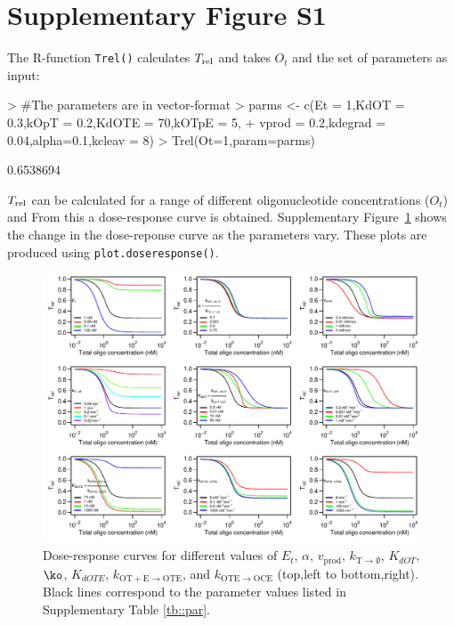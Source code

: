 \documentclass[a4paper,11pt]{article}
\newcommand{\kt}{k_{\mathrm{OT+E \to OTE}}}
\newcommand{\kE}{k_{\mathrm{OTE \to OCE}}}
\newcommand{\vp}{v_{\mathrm{prod}}}
\newcommand{\vd}{k_{\mathrm{T \to \emptyset}}}
\newcommand{\Trel}{T_{\rm{rel}}}
\begin{document}
\section{Supplementary Figure S1}
The R-function \texttt{Trel()} calculates $\Trel$ and takes $O_t$ and the set of parameters as input:
\begin{Schunk}
\begin{Sinput}
> #The parameters are in vector-format
> parms <- c(Et = 1,KdOT = 0.3,kOpT = 0.2,KdOTE = 70,kOTpE = 5,	
+            vprod = 0.2,kdegrad = 0.04,alpha=0.1,kcleav = 8)
> Trel(Ot=1,param=parms)
\end{Sinput}
\begin{Soutput}
[1] 0.6538694
\end{Soutput}
\end{Schunk}
$\Trel$ can be calculated for a range of different oligonucleotide concentrations ($O_t$) and From this a dose-response curve is obtained. Supplementary Figure~\ref{fig::Etot} shows the change in the dose-reponse curve as the parameters vary. These plots are produced using \texttt{plot.doseresponse()}.
\begin{figure}[!b]
\includegraphics[width=\textwidth]{SuppFile1-S1.pdf}
\caption{Dose-response curves for different values of $E_{t}$, $\alpha$, $\vp$, $\vd$, $K_{dOT}$, $\ko$, $K_{dOTE}$, $\kt$, and $\kE$ (top,left to bottom,right). Black lines correspond to the parameter values listed in Supplementary Table \ref{tb::par}.}\label{fig::Etot}
\end{figure}


\end{document}
